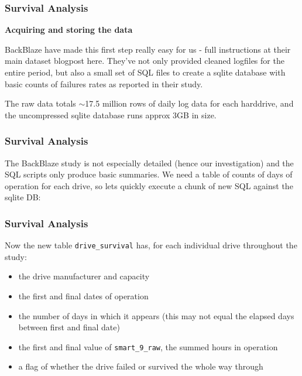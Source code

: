 \documentclass[]{beamer}
\begin{document}
	\begin{frame}
		\frametitle{Survival Analysis}
		\noindent \textbf{Acquiring and storing the data}
		
		BackBlaze have made this first step really easy for us - full instructions at their main dataset blogpost here. They've not only provided cleaned logfiles for the entire period, but also a small set of SQL files to create a sqlite database with basic counts of failures rates as reported in their study.
		
		The raw data totals $\sim$17.5 million rows of daily log data for each harddrive, and the uncompressed sqlite database runs approx 3GB in size.
	\end{frame}
	\begin{frame}[fragile]
		\frametitle{Survival Analysis}
		The BackBlaze study is not especially detailed (hence our investigation) and the SQL scripts only produce basic summaries. We need a table of counts of days of operation for each drive, so lets quickly execute a chunk of new SQL against the sqlite DB:
		
	\end{frame}
	\begin{frame}
		\frametitle{Survival Analysis}
		Now the new table \texttt{drive\_survival} has, for each individual drive throughout the study:
		
		\begin{itemize}
			\item the drive manufacturer and capacity
			\item the first and final dates of operation
			\item the number of days in which it appears (this may not equal the elapsed days between first and final date)
			\item the first and final value of \texttt{smart\_9\_raw}, the summed hours in operation
			\item a flag of whether the drive failed or survived the whole way through
		\end{itemize}
	\end{frame}
\end{document}
